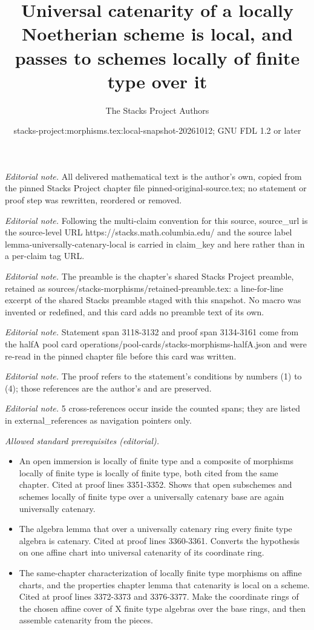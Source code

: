 \documentclass[10pt,a4paper]{amsart}
\title{Universal catenarity of a locally Noetherian scheme is local, and passes to schemes locally of finite type over it}
\author{The Stacks Project Authors}
\date{stacks-project:morphisms.tex:local-snapshot-20261012; GNU FDL 1.2 or later}
\theoremstyle{plain}
\theoremstyle{definition}
\theoremstyle{remark}
\numberwithin{equation}{subsection}
\begin{document}
\maketitle
\noindent\textit{Editorial note.} All delivered mathematical text is the author's own, copied from the pinned Stacks Project chapter file pinned-original-source.tex; no statement or proof step was rewritten, reordered or removed.\par\medskip
\noindent\textit{Editorial note.} Following the multi-claim convention for this source, source\_url is the source-level URL https://stacks.math.columbia.edu/ and the source label lemma-universally-catenary-local is carried in claim\_key and here rather than in a per-claim tag URL.\par\medskip
\noindent\textit{Editorial note.} The preamble is the chapter's shared Stacks Project preamble, retained as sources/stacks-morphisms/retained-preamble.tex: a line-for-line excerpt of the shared Stacks preamble staged with this snapshot. No macro was invented or redefined, and this card adds no preamble text of its own.\par\medskip
\noindent\textit{Editorial note.} Statement span 3118-3132 and proof span 3134-3161 come from the halfA pool card operations/pool-cards/stacks-morphisms-halfA.json and were re-read in the pinned chapter file before this card was written.\par\medskip
\noindent\textit{Editorial note.} The proof refers to the statement's conditions by numbers (1) to (4); those references are the author's and are preserved.\par\medskip
\noindent\textit{Editorial note.} 5 cross-references occur inside the counted spans; they are listed in external\_references as navigation pointers only.\par\medskip
\noindent\textit{Allowed standard prerequisites (editorial).}\begin{itemize}
\item An open immersion is locally of finite type and a composite of morphisms locally of finite type is locally of finite type, both cited from the same chapter. Cited at proof lines 3351-3352. Shows that open subschemes and schemes locally of finite type over a universally catenary base are again universally catenary.
\item The algebra lemma that over a universally catenary ring every finite type algebra is catenary. Cited at proof lines 3360-3361. Converts the hypothesis on one affine chart into universal catenarity of its coordinate ring.
\item The same-chapter characterization of locally finite type morphisms on affine charts, and the properties chapter lemma that catenarity is local on a scheme. Cited at proof lines 3372-3373 and 3376-3377. Make the coordinate rings of the chosen affine cover of X finite type algebras over the base rings, and then assemble catenarity from the pieces.
\end{itemize}\medskip
\end{document}
